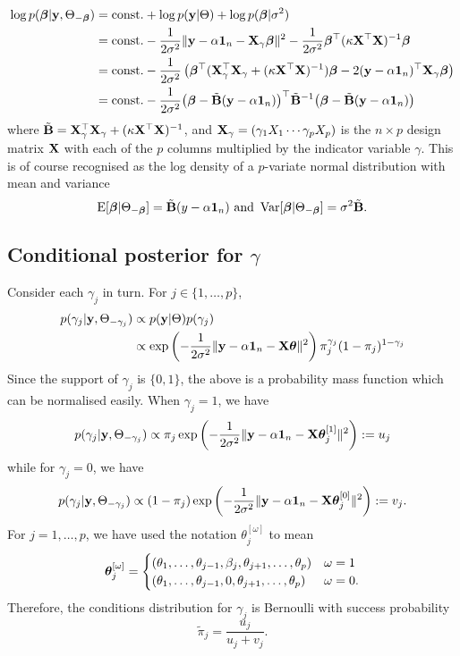 \begin{align*}
  \log p({\bm\beta}|{\mathbf y},\Theta_{-{\bm\beta}}) 
  &= \text{const.}\hspace{0.01em} + \log p({\mathbf y}|\Theta) + \log p({\bm\beta}|\sigma^2) \\
  &= \text{const.}\hspace{0.01em} - \frac{1}{2\sigma^2} \Vert {\mathbf y} - \alpha {\mathbf 1}_n - {\mathbf X}_\gamma{\bm\beta} \Vert^2  
  - \frac{1}{2\sigma^2}{\bm\beta}^\top (\kappa \mathbf X^\top \mathbf X)^{-1} {\bm\beta} \\
  &= \text{const.}\hspace{0.01em} - \frac{1}{2\sigma^2} \left( {\bm\beta}^\top ({\mathbf X}_\gamma^\top {\mathbf X}_\gamma + (\kappa \mathbf X^\top \mathbf X)^{-1}) {\bm\beta} - 2({\mathbf y} - \alpha {\mathbf 1}_n)^\top {\mathbf X}_\gamma{\bm\beta} \right) \\
  &= \text{const.}\hspace{0.01em} - \frac{1}{2\sigma^2} \big({\bm\beta} - \tilde {{\mathbf B}}({\mathbf y} - \alpha {\mathbf 1}_n)\big)^\top \tilde {{\mathbf B}}^{-1} \big({\bm\beta} - \tilde {{\mathbf B}}({\mathbf y} - \alpha {\mathbf 1}_n)\big) 
\end{align*}
where $\tilde {{\mathbf B}} = {\mathbf X}_\gamma^\top {\mathbf X}_\gamma + (\kappa \mathbf X^\top \mathbf X)^{-1}$, and ${\mathbf X}_\gamma = (\gamma_1X_1 \cdots \gamma_pX_p)$ is the $n \times p$ design matrix ${\mathbf X}$ with each of the $p$ columns multiplied by the indicator variable $\gamma$.
This is of course recognised as the log density of a $p$-variate normal distribution with mean and variance
\[
  \operatorname{E}[{\bm\beta}|\Theta_{-{\bm\beta}}] = \tilde {{\mathbf B}}(y - \alpha {\mathbf 1}_n) \text{ and } \operatorname{Var}[{\bm\beta}|\Theta_{-{\bm\beta}}] = \sigma^2\tilde {{\mathbf B}}.
 \]

\subsection{Conditional posterior for $\gamma$}

Consider each $\gamma_j$ in turn. For $j\in\{1,\dots,p\}$,
\begin{align*}
  p(\gamma_j|{\mathbf y},\Theta_{-\gamma_j}) 
  &\propto p({\mathbf y}|\Theta)p(\gamma_j) \\
  &\propto \exp\left( - \frac{1}{2\sigma^2} \Vert {\mathbf y} - \alpha {\mathbf 1}_n - {\mathbf X}{\bm\theta} \Vert^2 \right)
  \pi_j^{\gamma_j}(1-\pi_j)^{1-\gamma_j}
\end{align*}
Since the support of $\gamma_j$ is $\{0,1\}$, the above is a probability mass function which can be normalised easily.
When $\gamma_j=1$, we have 
\[
  p(\gamma_j|{\mathbf y},\Theta_{-\gamma_j}) 
  \propto \pi_j \exp\left( - \frac{1}{2\sigma^2} \Vert {\mathbf y} - \alpha {\mathbf 1}_n - {\mathbf X}{\bm\theta}_j^{[1]} \Vert^2 \right) := u_j
\]
while for $\gamma_j=0$, we have
\[
  p(\gamma_j|{\mathbf y},\Theta_{-\gamma_j}) \propto (1-\pi_j) \exp\left( - \frac{1}{2\sigma^2} \Vert {\mathbf y} - \alpha {\mathbf 1}_n - {\mathbf X}{\bm\theta}_j^{[0]} \Vert^2 \right) := v_j.
\]
For $j=1,\dots,p$, we have used the notation $\theta_j^{[\omega]}$ to mean
\[
  {\bm\theta}_j^{[\omega]} = 
  \begin{cases}
    (\theta_1,\dots,\theta_{j-1},\beta_j,\theta_{j+1},\dots,\theta_p) &\omega = 1 \\
    (\theta_1,\dots,\theta_{j-1},0,\theta_{j+1},\dots,\theta_p) &\omega = 0.
  \end{cases}
\]
Therefore, the conditions distribution for $\gamma_j$ is Bernoulli with success probability 
\[
  \tilde \pi_j = \frac{u_j}{u_j + v_j}.
\]


